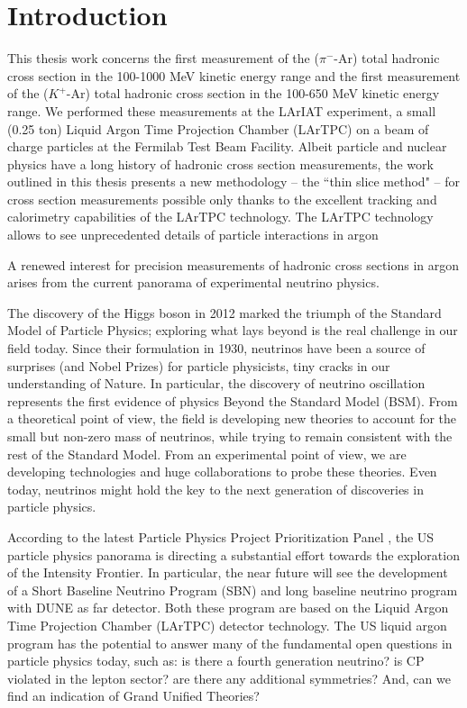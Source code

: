 \chapter{Introduction}\label{ch:-1}

This thesis work concerns the first measurement of the  ($\pi^-$-Ar)  total hadronic cross section  in the 100-1000 MeV  kinetic energy range and the first measurement of the ($K^+$-Ar) total hadronic cross section  in the 100-650 MeV  kinetic energy range. We performed these measurements at the LArIAT experiment,  a small (0.25 ton)  Liquid Argon Time Projection Chamber (LArTPC) on a beam of charge particles at the Fermilab Test Beam Facility.  Albeit particle and nuclear physics have a long history of hadronic cross section measurements, the work outlined in this thesis presents a new methodology -- the ``thin slice method" -- for cross section measurements possible only thanks to the excellent tracking and calorimetry capabilities of the LArTPC technology. The LArTPC technology allows to see unprecedented details of particle interactions in argon 

A renewed interest for precision measurements of hadronic cross sections in argon arises from the current panorama of experimental neutrino physics.

The discovery of the Higgs boson in 2012 marked the triumph of the Standard Model of Particle Physics; exploring what lays beyond is the real challenge in our field today. 
Since their formulation in 1930, neutrinos have been a source of surprises (and Nobel Prizes) for particle physicists, tiny cracks in our understanding of Nature. In particular, the discovery of neutrino oscillation represents the first evidence of physics Beyond the Standard Model (BSM).  From a theoretical point of view, the field is developing new theories to account for the small but non-zero mass of neutrinos, while trying to remain consistent with the rest of the Standard Model.  From an experimental point of view, we are developing technologies and huge collaborations to probe these theories. Even today, neutrinos might hold the key to the next generation of discoveries in particle physics.

According to the latest Particle Physics Project Prioritization Panel  \cite{P5}, the US particle physics panorama is directing a substantial effort towards the exploration of the Intensity Frontier. In particular, the near future will see the development of a Short Baseline Neutrino Program (SBN) and long baseline neutrino program with  DUNE as far detector. Both these program are based on the Liquid Argon Time Projection Chamber (LArTPC) detector technology. The US liquid argon program has the potential to answer many of the fundamental open questions in particle physics today, such as: is there a fourth generation neutrino? is CP violated in the lepton sector? are there any additional symmetries? And, can we find an indication of Grand Unified Theories? 

